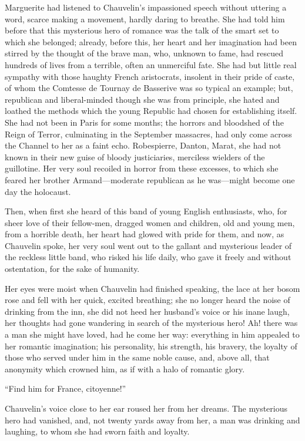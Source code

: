 \documentclass[paper=5.5in:8.5in,BCOR=7mm,twoside,DIV=calc,12pt,usegeometry,chapterprefix,endperiod,headings=big]{scrbook}
\begin{document}
Marguerite had listened to Chauvelin's impassioned \newline speech without uttering a word, scarce making a movement, hard\-ly daring to breathe. She had told him before that this mysterious hero of romance was the talk of the smart set to which she belonged; already, before this, her heart and her imagination had been stirred by the thought of the brave man, who, unknown to fame, had rescued hundreds of lives from a terrible, often an unmerciful fate. She had but little real sympathy with those haughty French aristocrats, insolent in their pride of caste, of whom the Comtesse de Tournay de Basserive was so typical an example; but, republican and liberal-minded though she was from principle, she hated and loathed the methods which the young Republic had chosen for establishing itself. She had not been in Paris for some months; the horrors and bloodshed of the Reign of Terror, culminating in the September massacres, had only come across the Channel to her as a faint echo. Robespierre, Danton, Marat, she had not known in their new guise of bloody justiciaries, merciless wielders of the guillotine. Her very soul recoiled in horror from these excesses, to which she feared her brother Armand---moderate republican as he was---might become one day the holocaust.

Then, when first she heard of this band of young English enthusiasts, who, for sheer love of their fellow-men, dragged women and children, old and young men, from a horrible death, her heart had glowed with pride for them, and now, as Chauvelin spoke, her very soul went out to the gallant and mysterious leader of the reckless little band, who risked his life daily, who gave it freely and without ostentation, for the sake of humanity.

Her eyes were moist when Chauvelin had finished speaking, the lace at her bosom rose and fell with her quick, excited breathing; she no longer heard the noise of drinking from the inn, she did not heed her husband's voice or his inane laugh, her thoughts had gone wandering in search of the mysterious hero! Ah! there was a man she might have loved, had he come her way: everything in him appealed to her romantic imagination; his personality, his strength, his bravery, the loyalty of those who served under him in the same noble cause, and, above all, that anonymity which crowned him, as if with a halo of romantic glory.

\enquote{Find him for France, citoyenne!}

Chauvelin's voice close to her ear roused her from her dreams. The mysterious hero had vanished, and, not twenty yards away from her, a man was drinking and laughing, to whom she had sworn faith and loyalty.
\end{document}
